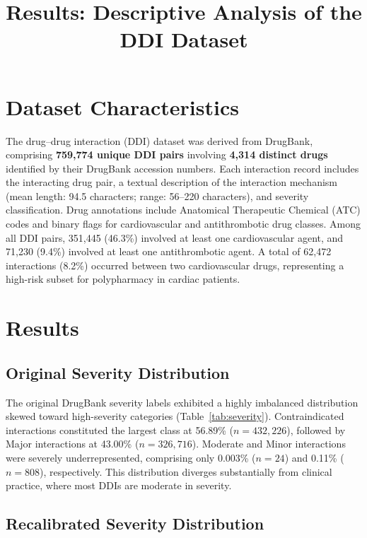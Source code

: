 \documentclass[11pt]{article}
\title{Results: Descriptive Analysis of the DDI Dataset}
\author{}
\date{}
\begin{document}
\maketitle

\section*{Dataset Characteristics}

The drug--drug interaction (DDI) dataset was derived from DrugBank, comprising \textbf{759,774 unique DDI pairs} involving \textbf{4,314 distinct drugs} identified by their DrugBank accession numbers. Each interaction record includes the interacting drug pair, a textual description of the interaction mechanism (mean length: 94.5 characters; range: 56--220 characters), and severity classification. Drug annotations include Anatomical Therapeutic Chemical (ATC) codes and binary flags for cardiovascular and antithrombotic drug classes. Among all DDI pairs, 351,445 (46.3\%) involved at least one cardiovascular agent, and 71,230 (9.4\%) involved at least one antithrombotic agent. A total of 62,472 interactions (8.2\%) occurred between two cardiovascular drugs, representing a high-risk subset for polypharmacy in cardiac patients.

\section*{Results}

\subsection*{Original Severity Distribution}

The original DrugBank severity labels exhibited a highly imbalanced distribution skewed toward high-severity categories (Table~\ref{tab:severity}). Contraindicated interactions constituted the largest class at 56.89\% ($n = 432,226$), followed by Major interactions at 43.00\% ($n = 326,716$). Moderate and Minor interactions were severely underrepresented, comprising only 0.003\% ($n = 24$) and 0.11\% ($n = 808$), respectively. This distribution diverges substantially from clinical practice, where most DDIs are moderate in severity.

\subsection*{Recalibrated Severity Distribution}
\end{document}
